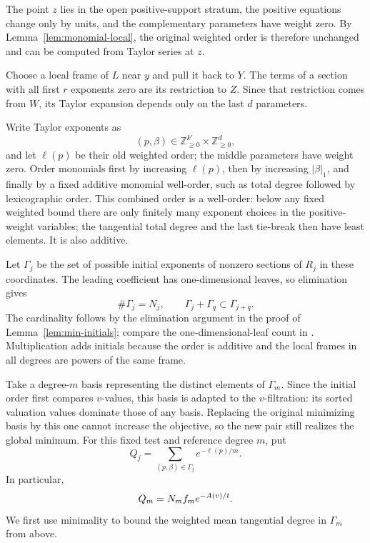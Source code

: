 The point $z$ lies in the open positive-support stratum, the positive
equations change only by units, and the complementary parameters have
weight zero. By Lemma~\ref{lem:monomial-local}, the original weighted
order is therefore unchanged and can be computed from Taylor series
at $z$.

Choose a local frame of $L$ near $y$ and pull it back to $Y$. The terms
of a section with all first $r$ exponents zero are its restriction to
$Z$. Since that restriction comes from $W$, its Taylor expansion
depends only on the last $d$ parameters.

Write Taylor exponents as
\[
 (p,\beta)\in\mathbb Z_{\ge0}^{k'}\times\mathbb Z_{\ge0}^{d},
\]
and let $\ell(p)$ be their old weighted order; the middle parameters
have weight zero. Order monomials first by increasing $\ell(p)$, then
by increasing $|\beta|_1$, and finally by a fixed additive monomial
well-order, such as total degree followed by lexicographic order. This
combined order is a well-order: below any fixed weighted bound there
are only finitely many exponent choices in the positive-weight
variables; the tangential total degree and the last tie-break then
have least elements. It is also additive.

Let $\Gamma_j$ be the set of possible initial exponents of nonzero
sections of $R_j$ in these coordinates. The leading coefficient has
one-dimensional leaves, so elimination gives
\begin{equation}\label{eq:center-semigroup}
 \#\Gamma_j=N_j,
 \qquad \Gamma_j+\Gamma_q\subset\Gamma_{j+q}.
\end{equation}
The cardinality follows by the elimination argument in the proof of
Lemma~\ref{lem:min-initials}; compare the one-dimensional-leaf count in
\cite[Proposition~2.6]{kavehkhovanskii2012}.
Multiplication adds initials because the
order is additive and the local frames in all degrees are powers of
the same frame.

Take a degree-$m$ basis representing the distinct elements of
$\Gamma_m$. Since the initial order first compares $v$-values, this
basis is adapted to the $v$-filtration: its sorted valuation values
dominate those of any basis. Replacing the original minimizing basis by
this one cannot increase the objective, so the new pair still realizes
the global minimum. For this fixed test and reference degree $m$, put
\begin{equation}\label{eq:center-q-b}
 Q_j=\sum_{(p,\beta)\in\Gamma_j}e^{-\ell(p)/m}.
\end{equation}
In particular,
\begin{equation}\label{eq:center-q-minimum}
 Q_m=N_m f_m e^{-A(v)/t}.
\end{equation}
We first use minimality to bound the weighted mean tangential degree in
$\Gamma_m$ from above.

